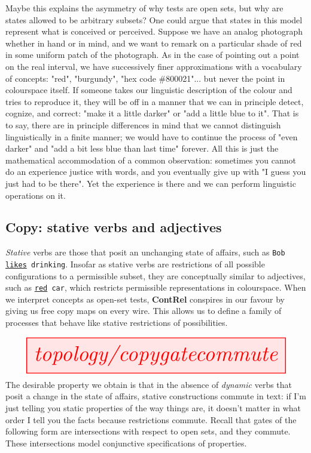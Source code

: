 Maybe this explains the asymmetry of why tests are open sets, but why are states allowed to be arbitrary subsets? One could argue that states in this model represent what is conceived or perceived. Suppose we have an analog photograph whether in hand or in mind, and we want to remark on a particular shade of red in some uniform patch of the photograph. As in the case of pointing out a point on the real interval, we have successively finer approximations with a vocabulary of concepts: "red", "burgundy", "hex code \#800021"... but never the point in colourspace itself. If someone takes our linguistic description of the colour and tries to reproduce it, they will be off in a manner that we can in principle detect, cognize, and correct: "make it a little darker" or "add a little blue to it". That is to say, there are in principle differences in mind that we cannot distinguish linguistically in a finite manner; we would have to continue the process of "even darker" and "add a bit less blue than last time" forever. All this is just the mathematical accommodation of a common observation: sometimes you cannot do an experience justice with words, and you eventually give up with "I guess you just had to be there". Yet the experience is there and we can perform linguistic operations on it.

\clearpage
\subsection{Copy: stative verbs and adjectives}

\emph{Stative} verbs are those that posit an unchanging state of affairs, such as \texttt{Bob \underline{likes} drinking}. Insofar as stative verbs are restrictions of all possible configurations to a permissible subset, they are conceptually similar to adjectives, such as \texttt{\underline{red} car}, which restricts permissible representations in colourspace. When we interpret concepts as open-set tests, \textbf{ContRel} conspires in our favour by giving us free copy maps on every wire. This allows us to define a family of processes that behave like stative restrictions of possibilities.

\[\resizebox{\textwidth}{!}{\tikzfig{topology/copygatecommute}}\]
The desirable property we obtain is that in the absence of \emph{dynamic} verbs that posit a change in the state of affairs, stative constructions commute in text: if I'm just telling you static properties of the way things are, it doesn't matter in what order I tell you the facts because restrictions commute. Recall that gates of the following form are intersections with respect to open sets, and they commute. These intersections model conjunctive specifications of properties.

